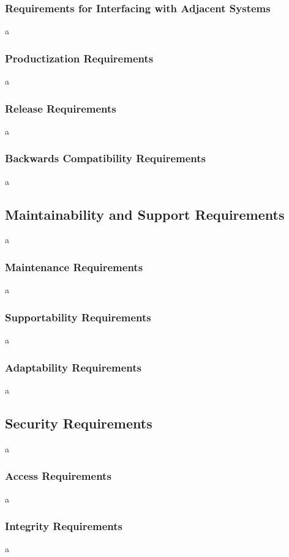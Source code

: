 \documentclass[12pt]{article}
\begin{document}
\subsubsection{Requirements for Interfacing with Adjacent Systems}
a

\subsubsection{Productization Requirements}
a

\subsubsection{Release Requirements}
a

\subsubsection{Backwards Compatibility Requirements}
a

\subsection{Maintainability and Support Requirements}
a

\subsubsection{Maintenance Requirements}
a

\subsubsection{Supportability Requirements}
a

\subsubsection{Adaptability Requirements}
a

\subsection{Security Requirements}
a

\subsubsection{Access Requirements}
a

\subsubsection{Integrity Requirements}
a
\end{document}
